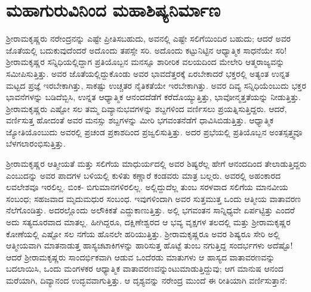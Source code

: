 
\chapter{ಮಹಾಗುರುವಿನಿಂದ ಮಹಾಶಿಷ್ಯನಿರ್ಮಾಣ}

\noindent

ಶ್ರೀರಾಮಕೃಷ್ಣರು ನರೇಂದ್ರನನ್ನು ಎಷ್ಟೇ ಪ್ರೀತಿಸಬಹುದು, ಅವನಲ್ಲಿ ಎಷ್ಟೇ ಸಲಿಗೆಯಿಂದಿರ ಬಹುದು; ಆದರೆ ಅವರ ಜೊತೆಯಲ್ಲಿ ಬದುಕುವುದೆಂದರೆ ಅದೊಂದು ತಪಸ್ಸೇ ಸರಿ. ಅದೊಂದು ಕಟ್ಟುನಿಟ್ಟಿನ ಆಧ್ಯಾತ್ಮಿಕ ಸಾಧನೆಯೇ ಸರಿ! ಶ್ರೀರಾಮಕೃಷ್ಣರ ಸನ್ನಿಧಿಯಲ್ಲಿದ್ದಾಗ ಪ್ರತಿಯೊಬ್ಬನ ಮನಸ್ಸೂ ಶಾರೀರಿಕ ವಲಯದಿಂದ ಮೇಲೇರಿ ಆತ್ಮರಾಜ್ಯವನ್ನು ಸಮೀಪಿಸುತ್ತಿತ್ತು. ಅವರ ಜೊತೆಯಲ್ಲಿದ್ದುಕೊಂಡು ಅವರ ಭಾವದೆತ್ತರಕ್ಕೆ ಏರಬೇಕಾದರೆ ಭಕ್ತರಲ್ಲಿ ಅತ್ಯಂತ ಉನ್ನತ ಮಟ್ಟದ ಪ್ರಜ್ಞೆ ಇರಬೇಕಾಗಿತ್ತು, ಸಾಕಷ್ಟು ಉಚ್ಚತರ ನೈತಿಕತೆಯೇ ಇರಬೇಕಾಗಿತ್ತು. ಅವರ ದಿವ್ಯ ಸನ್ನಿಧಿಯೆಂಬುದು ಭಕ್ತರ ಭಾವನೆಗಳನ್ನು ಬಡಿದೆಬ್ಬಿಸಿ, ಉನ್ನತ ಆಧ್ಯಾತ್ಮಿಕ ಆನಂದದೆಡೆಗೆ ಕರೆದೊಯ್ಯುತ್ತಿತ್ತು, ಭಾವೋನ್ಮತ್ತತೆಯನ್ನು ನೀಡುತ್ತಿತ್ತು. ಶ್ರೀರಾಮಕೃಷ್ಣರು ಎಷ್ಟೋ ಸಲ ತಮ್ಮ ದಿವ್ಯಾನುಭವಗಳನ್ನು ಶಬ್ದಗಳಿಂದ ವರ್ಣಿಸಲು ಪ್ರಯತ್ನಿಸುತ್ತಿದ್ದರು. ಆದರೆ, ವರ್ಣಿಸುತ್ತ ಹೋದಂತೆ ಅವರ ಮನಸ್ಸು ಶಬ್ದಗಳನ್ನು ಮೀರಿ ಭಗವಂತನೆಡೆಗೆ ಧಾವಿಸಿಬಿಡುತ್ತಿತ್ತು. ಆಧ್ಯಾತ್ಮಿಕ ಜ್ಯೋತಿಯೊಂಬುದು ಅವರಲ್ಲಿ ಪ್ರಚಂಡ ಪ್ರಕಾಶದಿಂದ ಪ್ರಜ್ವಲಿಸುತ್ತಿತ್ತು. ಅದರ ಪ್ರಭೆಯಲ್ಲಿ ಪ್ರತಿಯೊಬ್ಬನ ಅಂತಸ್ಸತ್ತ್ವವೂ ಬೆಳಗಲಾರಂಭಿಸುತ್ತಿತ್ತು.

ಶ್ರೀರಾಮಕೃಷ್ಣರ ಆತ್ಮೀಯತೆ ಮತ್ತು ಸಲಿಗೆಯ ಮಾಧುರ್ಯದಲ್ಲಿ ಅವರ ಶಿಷ್ಯರೆಲ್ಲ ಹೇಗೆ ಆನಂದದಿಂದ ತೇಲಾಡುತ್ತಿದ್ದರು ಎಂಬುದನ್ನು ಅವರ ಪಾದಗಳ ಬಳಿಯಲ್ಲಿ ಕುಳಿತು ಕಣ್ಣಾರೆ ಕಂಡವರು ಮಾತ್ರ ಬಲ್ಲರು. ಅವರಲ್ಲಿ ಅಹಂಕಾರದ ಲವಲೇಶವೂ ಇರಲಿಲ್ಲ. ಬಿಂಕ- ಬಿಗುಮಾನಗಳಿರಲಿಲ್ಲ. ಅಲ್ಲಿದ್ದುದೆಲ್ಲ ತುಂಬ ಸರಳವಾದ ಸಲಿಗೆಯ ಮಾನವೀಯ ಸಂಬಂಧ; ಸಹಜವಾದ ಮೃದುಮಧುರ ಸಂಬಂಧ. ಇವುಗಳಿಂದಾಗಿ ಅವರ ಸುತ್ತಮುತ್ತ ಒಂದು ಆತ್ಮೀಯ ವಾತಾವರಣ ನೆಲೆಗೊಂಡಿತ್ತು. ಅದರಲ್ಲೊಂದು ಅಲೌಕಿಕತೆ ಎದ್ದುಕಾಣುತ್ತಿತ್ತು. ಅಲ್ಲಿ ಭಗವಂತನ ಸಾನ್ನಿಧ್ಯವೇ ಏರ್ಪಟ್ಟಿತ್ತು ಎಂದರೆ ಅದು ಸತ್ಯದೂರವಾದ ಮಾತಲ್ಲ. ಹೀಗಿದ್ದರೂ, ದಕ್ಷಿಣೇಶ್ವರದ ಆ ಭವ್ಯ ವೃಕ್ಷಗಳ ತಲದಲ್ಲಿ ಮತ್ತು ಶ್ರೀರಾಮಕೃಷ್ಣರ ಕೋಣೆಯಲ್ಲಿ ಎಷ್ಟೋ ಸಲ ನಗೆಯ ಹೊನಲೇ ಹರಿಯುತ್ತಿತ್ತು. ಶ್ರೀರಾಮಕೃಷ್ಣರೂ ಅವರ ಶಿಷ್ಯರೂ ಸೇರಿ ಅಲ್ಲಿ ಆತ್ಮೀಯವಾಗಿ ಮಾತನಾಡುತ್ತ ಹಾಸ್ಯಚಟಾಕಿಗಳನ್ನು ಹಾರಿಸುತ್ತ ಹೊಟ್ಟೆ ತುಂಬ ನಗುತ್ತಿದ್ದ ಸಂದರ್ಭಗಳು ಅದೆಷ್ಟೊ! ಆದರೆ ಶ್ರೀರಾಮಕೃಷ್ಣರು ಸಾಂದರ್ಭಿಕವಾಗಿ ಆಡುವ ಒಂದೆರಡು ಮಾತುಗಳು ಆ ಹಾಸ್ಯದ ವಾತಾವರಣವನ್ನು ಬದಲಾಯಿಸಿ, ಒಂದು ಮಂಗಳಕರ ಆಧ್ಯಾತ್ಮಿಕ ವಾತಾವರಣವನ್ನುಂಟುಮಾಡುತ್ತಿದ್ದುವು; ಆಗ ಮಾನುಷ ಆನಂದ ಮರೆಯಾಗಿ, ದಿವ್ಯಾನಂದ ಉದ್ಭವವಾಗುತ್ತಿತ್ತು. ಆ ದೃಶ್ಯವನ್ನು ನರೇಂದ್ರ ಮುಂದೆ ಈ ರೀತಿಯಾಗಿ ವರ್ಣಿಸುತ್ತಾನೆ:

